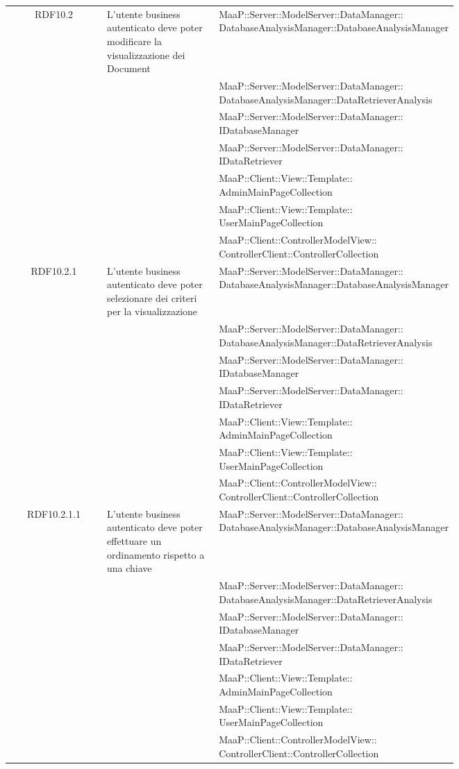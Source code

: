 \begin{center}
\begin{longtable}{|c|p{0.25\linewidth}|p{0.5\linewidth}|}
\midrule
RDF10.2
& L'utente business autenticato deve poter modificare la visualizzazione dei Document
& MaaP::Server::ModelServer::DataManager:: DatabaseAnalysisManager::DatabaseAnalysisManager\\
& & MaaP::Server::ModelServer::DataManager:: DatabaseAnalysisManager::DataRetrieverAnalysis\\
& & MaaP::Server::ModelServer::DataManager:: IDatabaseManager\\
& & MaaP::Server::ModelServer::DataManager:: IDataRetriever\\
& & MaaP::Client::View::Template:: AdminMainPageCollection\\
& & MaaP::Client::View::Template:: UserMainPageCollection\\
& & MaaP::Client::ControllerModelView:: ControllerClient::ControllerCollection\\

\midrule
RDF10.2.1
& L'utente business autenticato deve poter selezionare dei criteri per la visualizzazione
& MaaP::Server::ModelServer::DataManager:: DatabaseAnalysisManager::DatabaseAnalysisManager\\
& & MaaP::Server::ModelServer::DataManager:: DatabaseAnalysisManager::DataRetrieverAnalysis\\
& & MaaP::Server::ModelServer::DataManager:: IDatabaseManager\\
& & MaaP::Server::ModelServer::DataManager:: IDataRetriever\\
& & MaaP::Client::View::Template:: AdminMainPageCollection\\
& & MaaP::Client::View::Template:: UserMainPageCollection\\
& & MaaP::Client::ControllerModelView:: ControllerClient::ControllerCollection\\

\midrule
RDF10.2.1.1
& L'utente business autenticato deve poter effettuare un ordinamento rispetto a una chiave
& MaaP::Server::ModelServer::DataManager:: DatabaseAnalysisManager::DatabaseAnalysisManager\\
& & MaaP::Server::ModelServer::DataManager:: DatabaseAnalysisManager::DataRetrieverAnalysis\\
& & MaaP::Server::ModelServer::DataManager:: IDatabaseManager\\
& & MaaP::Server::ModelServer::DataManager:: IDataRetriever\\
& & MaaP::Client::View::Template:: AdminMainPageCollection\\
& & MaaP::Client::View::Template:: UserMainPageCollection\\
& & MaaP::Client::ControllerModelView:: ControllerClient::ControllerCollection\\


\end{longtable}
\end{center}
